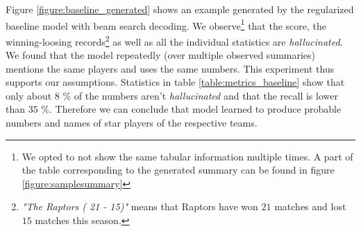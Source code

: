 \begin{table}[h]
    \centering
    \caption{Performance metrics on the baseline models.} \label{table:metrics_baseline}
\end{table}

Figure \ref{figure:baseline_generated} shows an example generated by the regularized baseline model with beam search decoding. We observe\footnote{We opted to not show the same tabular information multiple times. A part of the table corresponding to the generated summary can be found in figure \ref{figure:samplesummary}} that the score, the winning-loosing records\footnote{\emph{"The Raptors ( 21 - 15)"} means that Raptors have won $21$ matches and lost $15$ matches this season.} as well as all the individual statistics are \emph{hallucinated}. We found that the model repeatedly (over multiple observed summaries) mentions the same players and uses the same numbers. This experiment thus supports our assumptions. Statistics in table \ref{table:metrics_baseline} show that only about $8$ \% of the numbers aren't \emph{hallucinated} and that the recall is lower than $35$ \%. Therefore we can conclude that model learned to produce probable numbers and names of star players of the respective teams. 


